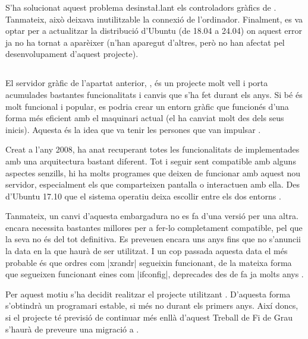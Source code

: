 S'ha solucionat aquest problema desinsta\l.lant els controladors gràfics de
. Tanmateix, això deixava inutilitzable la connexió  de
l'ordinador. Finalment, es va optar per a actualitzar la distribució d'Ubuntu
(de 18.04 a 24.04) on aquest error ja no ha tornat a aparèixer (n'han aparegut
d'altres, però no han afectat pel desenvolupament d'aquest projecte).

\subsection{}
\label{subsec:wayland}

El servidor gràfic de l'apartat anterior, , és un projecte molt vell
i porta acumulades bastantes funcionalitats i canvis que s'ha fet durant els
anys. Si bé és molt funcional i popular, es podria crear un entorn gràfic que
funcionés d'una forma més eficient amb el maquinari actual (el 
ha canviat molt des dels seus inicis). Aquesta és la idea que va tenir les
persones que van impulsar .

Creat a l'any 2008, ha anat recuperant totes les funcionalitats de 
implementades amb una arquitectura bastant diferent. Tot i seguir sent
compatible amb alguns aspectes senzills, hi ha molts programes que deixen de
funcionar amb aquest nou servidor, especialment els que comparteixen pantalla
o interactuen amb ella. Des d'Ubuntu 17.10 que el sistema operatiu deixa
escollir entre els dos entorns \cite{Wayland}.

Tanmateix, un canvi d'aquesta embargadura no es fa d'una versió per una altra.
 encara necessita bastantes millores per a fer-lo completament
compatible, pel que la seva  no és del tot definitiva. Es preveuen
encara uns anys fins que no s'anuncii la data en la que  haurà de
ser utilitzat. I un cop passada aquesta data el més probable és que ordres
com \ord|xrandr| segueixin funcionant, de la mateixa forma que segueixen
funcionant eines com \ord|ifconfig|, deprecades des de fa ja molts anys
\cite{Ifconfig}.

Per aquest motiu s'ha decidit realitzar el projecte utilitzant .
D'aquesta forma s'obtindrà un programari estable, si més no durant els primers
anys. Així doncs, si el projecte té previsió de continuar més enllà d'aquest
Treball de Fi de Grau s'haurà de preveure una migració a .
